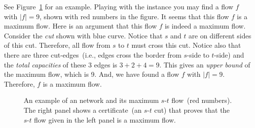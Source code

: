 \documentclass[letterpaper,11pt]{article}
\theoremstyle{mytheorem}
\begin{document}
See Figure~\ref{fig:maxflow} for an example. Playing with the instance you may find
a flow $f$ with $|f| = 9$, shown with red numbers in the figure.
It seems that this flow $f$ is a maximum flow.
Here is an argument that this flow $f$ is indeed a maximum flow.
Consider the \emph{cut} shown with blue curve. Notice that
$s$ and $t$ are on different sides of this cut. Therefore, all flow
from $s$ to $t$ must cross this cut. Notice also that there are three
cut-edges~(i.e., edges cross the border from $s$-side to $t$-side)
and the \emph{total capacities} of these 3 edges is $3 + 2 + 4 = 9$.
This gives an \emph{upper bound} of the maximum flow, which is 9.
And, we have found a flow $f$ with $|f| = 9$. Therefore, $f$
is a maximum flow.

\begin{figure}[h]
\centering{}
\caption{An example of an network and its maximum $s$-$t$ flow~(red numbers).
The right panel shows a certificate~(an $s$-$t$ cut) that proves that
the $s$-$t$ flow given in the left panel is a maximum flow.}
\label{fig:maxflow}
\end{figure}
\end{document}
